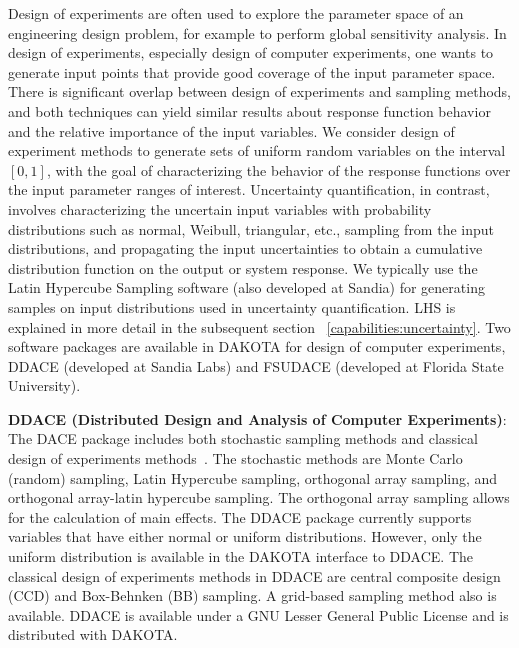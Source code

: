 Design of experiments are often used to explore the parameter space of
an engineering design problem, for example to perform global
sensitivity analysis.  In design of experiments, especially design of
computer experiments, one wants to generate input points that provide
good coverage of the input parameter space.  There is significant
overlap between design of experiments and sampling methods, and both
techniques can yield similar results about response function behavior
and the relative importance of the input variables.  We consider
design of experiment methods to generate sets of uniform random
variables on the interval $[0,1]$, with the goal of characterizing the
behavior of the response functions over the input parameter ranges of
interest. Uncertainty quantification, in contrast, involves
characterizing the uncertain input variables with probability
distributions such as normal, Weibull, triangular, etc., sampling from
the input distributions, and propagating the input uncertainties to
obtain a cumulative distribution function on the output or system
response.  We typically use the Latin Hypercube Sampling software
(also developed at Sandia) for generating samples on input
distributions used in uncertainty quantification.  LHS is explained in
more detail in the subsequent section ~\ref{capabilities:uncertainty}.
Two software packages are available in DAKOTA for design of computer
experiments, DDACE (developed at Sandia Labs) and FSUDACE (developed
at Florida State University).

\textbf{DDACE (Distributed Design and Analysis of Computer Experiments)}:
The DACE package includes both stochastic sampling methods and
classical design of experiments methods~\cite{TonXX}. The stochastic
methods are Monte Carlo (random) sampling, Latin Hypercube sampling,
orthogonal array sampling, and orthogonal array-latin hypercube
sampling. The orthogonal array sampling allows for the calculation
of main effects. The DDACE package currently supports variables that have
either normal or uniform distributions.  However, only the uniform
distribution is available in the DAKOTA interface to DDACE. The
classical design of experiments methods in DDACE are central composite
design (CCD) and Box-Behnken (BB) sampling. A grid-based sampling
method also is available. DDACE is available under a GNU Lesser
General Public License and is distributed with DAKOTA.

